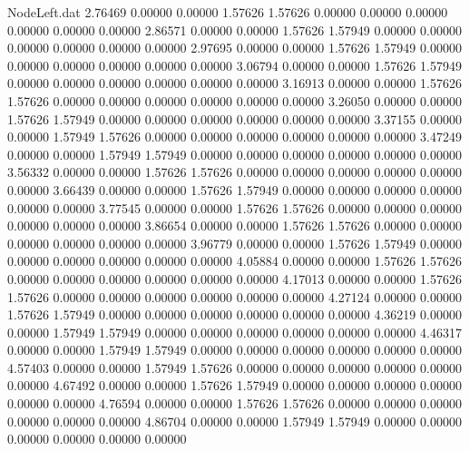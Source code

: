 \begin{filecontents}{NodeLeft.dat}
   2.76469    0.00000    0.00000     1.57626    1.57626    0.00000    0.00000    0.00000    0.00000    0.00000    0.00000
   2.86571    0.00000    0.00000     1.57626    1.57949    0.00000    0.00000    0.00000    0.00000    0.00000    0.00000
   2.97695    0.00000    0.00000     1.57626    1.57949    0.00000    0.00000    0.00000    0.00000    0.00000    0.00000
   3.06794    0.00000    0.00000     1.57626    1.57949    0.00000    0.00000    0.00000    0.00000    0.00000    0.00000
   3.16913    0.00000    0.00000     1.57626    1.57626    0.00000    0.00000    0.00000    0.00000    0.00000    0.00000
   3.26050    0.00000    0.00000     1.57626    1.57949    0.00000    0.00000    0.00000    0.00000    0.00000    0.00000
   3.37155    0.00000    0.00000     1.57949    1.57626    0.00000    0.00000    0.00000    0.00000    0.00000    0.00000
   3.47249    0.00000    0.00000     1.57949    1.57949    0.00000    0.00000    0.00000    0.00000    0.00000    0.00000
   3.56332    0.00000    0.00000     1.57626    1.57626    0.00000    0.00000    0.00000    0.00000    0.00000    0.00000
   3.66439    0.00000    0.00000     1.57626    1.57949    0.00000    0.00000    0.00000    0.00000    0.00000    0.00000
   3.77545    0.00000    0.00000     1.57626    1.57626    0.00000    0.00000    0.00000    0.00000    0.00000    0.00000
   3.86654    0.00000    0.00000     1.57626    1.57626    0.00000    0.00000    0.00000    0.00000    0.00000    0.00000
   3.96779    0.00000    0.00000     1.57626    1.57949    0.00000    0.00000    0.00000    0.00000    0.00000    0.00000
   4.05884    0.00000    0.00000     1.57626    1.57626    0.00000    0.00000    0.00000    0.00000    0.00000    0.00000
   4.17013    0.00000    0.00000     1.57626    1.57626    0.00000    0.00000    0.00000    0.00000    0.00000    0.00000
   4.27124    0.00000    0.00000     1.57626    1.57949    0.00000    0.00000    0.00000    0.00000    0.00000    0.00000
   4.36219    0.00000    0.00000     1.57949    1.57949    0.00000    0.00000    0.00000    0.00000    0.00000    0.00000
   4.46317    0.00000    0.00000     1.57949    1.57949    0.00000    0.00000    0.00000    0.00000    0.00000    0.00000
   4.57403    0.00000    0.00000     1.57949    1.57626    0.00000    0.00000    0.00000    0.00000    0.00000    0.00000
   4.67492    0.00000    0.00000     1.57626    1.57949    0.00000    0.00000    0.00000    0.00000    0.00000    0.00000
   4.76594    0.00000    0.00000     1.57626    1.57626    0.00000    0.00000    0.00000    0.00000    0.00000    0.00000
   4.86704    0.00000    0.00000     1.57949    1.57949    0.00000    0.00000    0.00000    0.00000    0.00000    0.00000

\end{filecontents}
